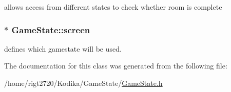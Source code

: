 allows access from different states to check whether room is complete 

\hypertarget{classGameState_a877c0c626d54802e54e876a56dc6603b}{
\subsubsection[{screen}]{$\ast$ Game\-State\-::screen\hspace{0.3cm}{\ttfamily [protected]}}}\label{classGameState_a877c0c626d54802e54e876a56dc6603b}


defines which gamestate will be used. 



The documentation for this class was generated from the following file\-:\begin{DoxyCompactItemize}
\item 
/home/rigt2720/\-Kodika/\-Game\-State/\hyperlink{GameState_8h}{Game\-State.\-h}\end{DoxyCompactItemize}
